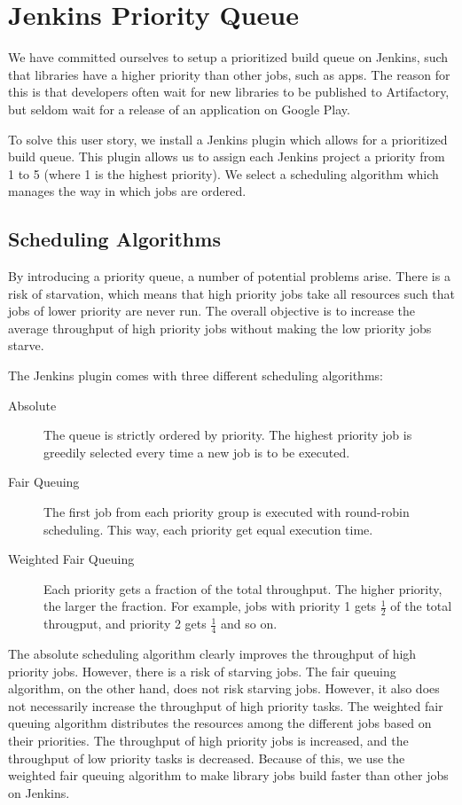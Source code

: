 \chapter{Jenkins Priority Queue}
We have committed ourselves to setup a prioritized build queue on Jenkins, such that libraries have a higher priority than other jobs, such as apps. The reason for this is that developers often wait for new libraries to be published to Artifactory, but seldom wait for a release of an application on Google Play.

To solve this user story, we install a Jenkins plugin \parencite{jenkins-priority-plugin} which allows for a prioritized build queue. This plugin allows us to assign each Jenkins project a priority from 1 to 5 (where 1 is the highest priority). We select a scheduling algorithm which manages the way in which jobs are ordered.

\section{Scheduling Algorithms}
By introducing a priority queue, a number of potential problems arise. There is a risk of starvation, which means that high priority jobs take all resources such that jobs of lower priority are never run. The overall objective is to increase the average throughput of high priority jobs without making the low priority jobs starve.

The Jenkins plugin comes with three different scheduling algorithms:

\begin{description}
  \item[Absolute] The queue is strictly ordered by priority. The highest priority job is greedily selected every time a new job is to be executed.
  \item[Fair Queuing] The first job from each priority group is executed with round-robin scheduling. This way, each priority get equal execution time.
  \item[Weighted Fair Queuing] Each priority gets a fraction of the total throughput. The higher priority, the larger the fraction. For example, jobs with priority 1 gets $\frac{1}{2}$ of the total througput, and priority 2 gets $\frac{1}{4}$ and so on.
\end{description}

The absolute scheduling algorithm clearly improves the throughput of high priority jobs. However, there is a risk of starving jobs. The fair queuing algorithm, on the other hand, does not risk starving jobs. However, it also does not necessarily increase the throughput of high priority tasks. The weighted fair queuing algorithm distributes the resources among the different jobs based on their priorities. The throughput of high priority jobs is increased, and the throughput of low priority tasks is decreased. Because of this, we use the weighted fair queuing algorithm to make library jobs build faster than other jobs on Jenkins.
